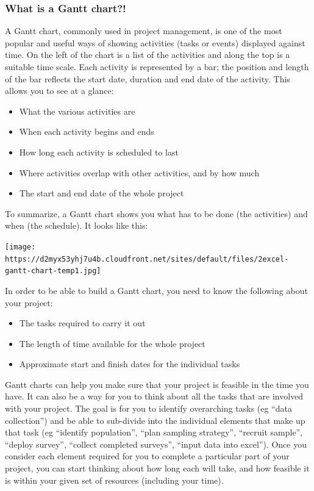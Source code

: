 \documentclass[
]{book}
\providecommand{\tightlist}{%
  \setlength{\itemsep}{0pt}\setlength{\parskip}{0pt}}
\begin{document}
\hypertarget{what-is-a-gantt-chart}{%
\subsubsection{What is a Gantt chart?!}\label{what-is-a-gantt-chart}}

A Gantt chart, commonly used in project management, is one of the most popular and useful ways of showing activities (tasks or events) displayed against time. On the left of the chart is a list of the activities and along the top is a suitable time scale. Each activity is represented by a bar; the position and length of the bar reflects the start date, duration and end date of the activity. This allows you to see at a glance:

\begin{itemize}
\tightlist
\item
  What the various activities are
\item
  When each activity begins and ends
\item
  How long each activity is scheduled to last
\item
  Where activities overlap with other activities, and by how much
\item
  The start and end date of the whole project
\end{itemize}

To summarize, a Gantt chart shows you what has to be done (the activities) and when (the schedule). It looks like this:

\texttt{[image: https://d2myx53yhj7u4b.cloudfront.net/sites/default/files/2excel-gantt-chart-temp1.jpg]}

In order to be able to build a Gantt chart, you need to know the following about your project:

\begin{itemize}
\tightlist
\item
  The tasks required to carry it out
\item
  The length of time available for the whole project
\item
  Approximate start and finish dates for the individual tasks
\end{itemize}

Gantt charts can help you make sure that your project is feasible in the time you have. It can also be a way for you to think about all the tasks that are involved with your project. The goal is for you to identify overarching tasks (eg ``data collection'') and be able to sub-divide into the individual elements that make up that task (eg ``identify population'', ``plan sampling strategy'', ``recruit sample'', ``deploy survey'', ``collect completed surveys'', ``input data into excel''). Once you consider each element required for you to complete a particular part of your project, you can start thinking about how long each will take, and how feasible it is within your given set of resources (including your time).
\end{document}
